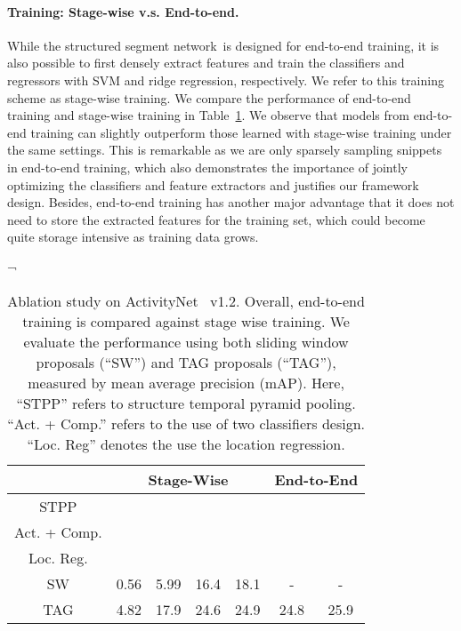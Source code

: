 \documentclass[10pt,twocolumn,letterpaper]{article}
\newcommand{\SSN}{structured segment network}
\begin{document}
\vspace{-12pt}
\paragraph{Training: Stage-wise v.s. End-to-end.}
While the \SSN~is designed for end-to-end training, it is also possible to first densely extract features and train the classifiers and regressors with SVM and ridge regression, respectively.
We refer to this training scheme as stage-wise training.
We compare the performance of end-to-end training and stage-wise training in Table~\ref{table:component}.
We observe that models from end-to-end training can slightly outperform those learned with stage-wise training under the same settings.
This is remarkable as we are only sparsely sampling snippets in end-to-end training, which also demonstrates the importance of jointly optimizing the classifiers and feature extractors and justifies our framework design. 
Besides, end-to-end training has another major advantage that it does not need to store the extracted features for the training set, which could become quite storage intensive as training data grows.

\begin{table}[t]
\begin{center}
\setlength{\tabcolsep}{4.8pt}¬
\begin{tabular}{c|cccc|cc}
	\hline
	\multicolumn{1}{c|}{} & \multicolumn{4}{c|}{Stage-Wise}            & \multicolumn{2}{c}{End-to-End} \\ \hline
	STPP                  &     & \checkmark & \checkmark & \checkmark & \checkmark     & \checkmark    \\
	Act. + Comp.    &     &            & \checkmark & \checkmark & \checkmark     & \checkmark    \\
	Loc. Reg.   &     &            &            & \checkmark &                & \checkmark    \\ \hline
	SW       & 0.56 &  5.99  & 16.4         &    18.1      & -             &    -         \\ \hline
	TAG                   & 4.82 & 17.9         & 24.6         & 24.9         & 24.8             & 25.9            \\ \hline
\end{tabular}
\end{center}
\caption{\small
	Ablation study on ActivityNet~\cite{caba2015activitynet} v1.2. 
	Overall, end-to-end training is compared against stage wise training.
	We evaluate the performance using both sliding window proposals (``SW'') and TAG proposals (``TAG''), measured by mean average precision (mAP).
	Here, ``STPP'' refers to structure temporal pyramid pooling.
	``Act. + Comp.'' refers to the use of two classifiers design. 
	``Loc. Reg'' denotes the use the location regression.}
\label{table:component}
\vspace{-12pt}
\end{table}
\end{document}
